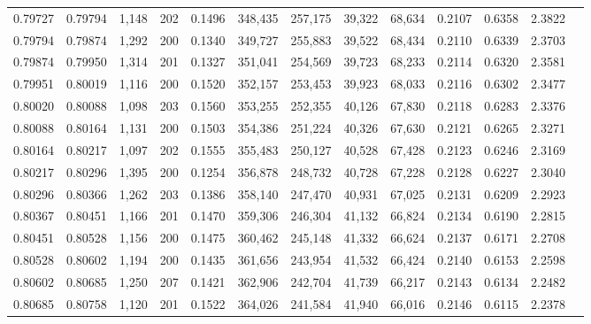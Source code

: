\begin{tabular}{rrrrrrrrrrrrr}
0.79727 & 0.79794 & 1,148 & 202 &                                     0.1496 & 348,435 & 257,175 &  39,322 &  68,634 & 0.2107 & 0.6358 & 2.3822 \\
0.79794 & 0.79874 & 1,292 & 200 &                                     0.1340 & 349,727 & 255,883 &  39,522 &  68,434 & 0.2110 & 0.6339 & 2.3703 \\
0.79874 & 0.79950 & 1,314 & 201 &                                     0.1327 & 351,041 & 254,569 &  39,723 &  68,233 & 0.2114 & 0.6320 & 2.3581 \\
0.79951 & 0.80019 & 1,116 & 200 &                                     0.1520 & 352,157 & 253,453 &  39,923 &  68,033 & 0.2116 & 0.6302 & 2.3477 \\
0.80020 & 0.80088 & 1,098 & 203 &                                     0.1560 & 353,255 & 252,355 &  40,126 &  67,830 & 0.2118 & 0.6283 & 2.3376 \\
0.80088 & 0.80164 & 1,131 & 200 &                                     0.1503 & 354,386 & 251,224 &  40,326 &  67,630 & 0.2121 & 0.6265 & 2.3271 \\
0.80164 & 0.80217 & 1,097 & 202 &                                     0.1555 & 355,483 & 250,127 &  40,528 &  67,428 & 0.2123 & 0.6246 & 2.3169 \\
0.80217 & 0.80296 & 1,395 & 200 &                                     0.1254 & 356,878 & 248,732 &  40,728 &  67,228 & 0.2128 & 0.6227 & 2.3040 \\
0.80296 & 0.80366 & 1,262 & 203 &                                     0.1386 & 358,140 & 247,470 &  40,931 &  67,025 & 0.2131 & 0.6209 & 2.2923 \\
0.80367 & 0.80451 & 1,166 & 201 &                                     0.1470 & 359,306 & 246,304 &  41,132 &  66,824 & 0.2134 & 0.6190 & 2.2815 \\
0.80451 & 0.80528 & 1,156 & 200 &                                     0.1475 & 360,462 & 245,148 &  41,332 &  66,624 & 0.2137 & 0.6171 & 2.2708 \\
0.80528 & 0.80602 & 1,194 & 200 &                                     0.1435 & 361,656 & 243,954 &  41,532 &  66,424 & 0.2140 & 0.6153 & 2.2598 \\
0.80602 & 0.80685 & 1,250 & 207 &                                     0.1421 & 362,906 & 242,704 &  41,739 &  66,217 & 0.2143 & 0.6134 & 2.2482 \\
0.80685 & 0.80758 & 1,120 & 201 &                                     0.1522 & 364,026 & 241,584 &  41,940 &  66,016 & 0.2146 & 0.6115 & 2.2378 \\

\end{tabular}
